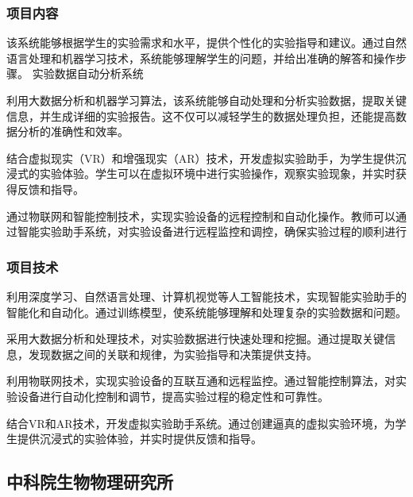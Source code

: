 \subsubsection{项目内容}



该系统能够根据学生的实验需求和水平，提供个性化的实验指导和建议。通过自然语言处理和机器学习技术，系统能够理解学生的问题，并给出准确的解答和操作步骤。
实验数据自动分析系统

利用大数据分析和机器学习算法，该系统能够自动处理和分析实验数据，提取关键信息，并生成详细的实验报告。这不仅可以减轻学生的数据处理负担，还能提高数据分析的准确性和效率。



结合虚拟现实（VR）和增强现实（AR）技术，开发虚拟实验助手，为学生提供沉浸式的实验体验。学生可以在虚拟环境中进行实验操作，观察实验现象，并实时获得反馈和指导。



通过物联网和智能控制技术，实现实验设备的远程控制和自动化操作。教师可以通过智能实验助手系统，对实验设备进行远程监控和调控，确保实验过程的顺利进行

\subsubsection{项目技术}



利用深度学习、自然语言处理、计算机视觉等人工智能技术，实现智能实验助手的智能化和自动化。通过训练模型，使系统能够理解和处理复杂的实验数据和问题。



采用大数据分析和处理技术，对实验数据进行快速处理和挖掘。通过提取关键信息，发现数据之间的关联和规律，为实验指导和决策提供支持。



利用物联网技术，实现实验设备的互联互通和远程监控。通过智能控制算法，对实验设备进行自动化控制和调节，提高实验过程的稳定性和可靠性。



结合VR和AR技术，开发虚拟实验助手系统。通过创建逼真的虚拟实验环境，为学生提供沉浸式的实验体验，并实时提供反馈和指导。


\subsection{中科院生物物理研究所}\label{中科院生物物理研究所}

